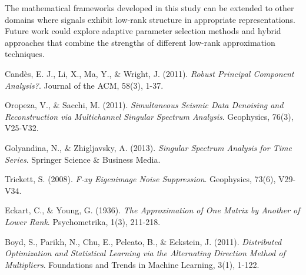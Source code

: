 \documentclass[11pt]{article}
\begin{document}
The mathematical frameworks developed in this study can be extended to other domains where signals exhibit low-rank structure in appropriate representations. Future work could explore adaptive parameter selection methods and hybrid approaches that combine the strengths of different low-rank approximation techniques.

\begin{thebibliography}{9}

Candès, E. J., Li, X., Ma, Y., \& Wright, J. (2011).
\textit{Robust Principal Component Analysis?}.
Journal of the ACM, 58(3), 1-37.

Oropeza, V., \& Sacchi, M. (2011).
\textit{Simultaneous Seismic Data Denoising and Reconstruction via Multichannel Singular Spectrum Analysis}.
Geophysics, 76(3), V25-V32.

Golyandina, N., \& Zhigljavsky, A. (2013).
\textit{Singular Spectrum Analysis for Time Series}.
Springer Science \& Business Media.

Trickett, S. (2008).
\textit{F-xy Eigenimage Noise Suppression}.
Geophysics, 73(6), V29-V34.

Eckart, C., \& Young, G. (1936).
\textit{The Approximation of One Matrix by Another of Lower Rank}.
Psychometrika, 1(3), 211-218.

Boyd, S., Parikh, N., Chu, E., Peleato, B., \& Eckstein, J. (2011).
\textit{Distributed Optimization and Statistical Learning via the Alternating Direction Method of Multipliers}.
Foundations and Trends in Machine Learning, 3(1), 1-122.

\end{thebibliography}
\end{document}
